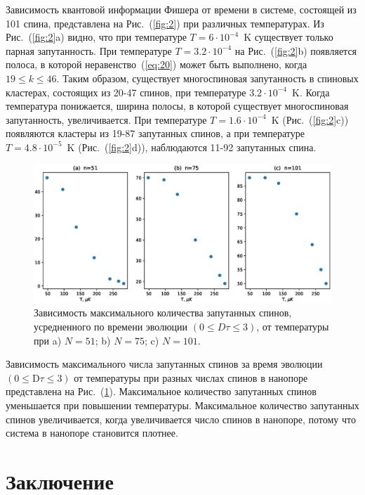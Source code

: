 \documentclass[utf8]{jetp}
\begin{document}
 Зависимость квантовой информации Фишера от времени в системе, состоящей из 101 спина, представлена на Рис.~(\ref{fig:2}) при различных температурах.
Из Рис.~(\ref{fig:2}a) видно, что при температуре $T=6\cdot10^{-4}$~K существует только парная запутанность.
При температуре $T=3.2\cdot10^{-4}$ на Рис.~(\ref{fig:2}b) появляется полоса, в которой неравенство~(\ref{eq:20}) может быть выполнено, когда $19 \leq k \leq 46$.
Таким образом, существует многоспиновая запутанность в спиновых кластерах, состоящих из 20-47 спинов, при температуре $3.2\cdot10^{-4}$~K.
Когда температура понижается, ширина полосы, в которой существует многоспиновая запутанность, увеличивается.
При температуре $T=1.6\cdot10^{-4}$~K (Рис.~(\ref{fig:2}c)) появляются кластеры из 19-87 запутанных спинов, а при температуре $T=4.8\cdot10^{-5}$~K (Рис.~(\ref{fig:2}d)), наблюдаются 11-92 запутанных спина.

\begin{figure}
 	\includegraphics[width=0.95\linewidth]{entangled_spins_by_n.eps}
	\caption{
	  Зависимость максимального количества запутанных спинов,
	  усредненного по времени эволюции $(0 \leq D\tau \leq 3)$,
	  от температуры при  a) $N=51$; b) $N=75$; c) $N=101$.
	}
	\label{fig:3}
\end{figure}

Зависимость максимального числа запутанных спинов за время эволюции $({0}\leq \mathrm{D}\tau\leq{3})$ от температуры при разных числах спинов в нанопоре представлена на Рис.~(\ref{fig:3}).
Максимальное количество запутанных спинов уменьшается при повышении температуры.
Максимальное количество запутанных спинов увеличивается, когда увеличивается число спинов в нанопоре, потому что система в нанопоре становится плотнее.



\section{Заключение}
\label{sec:6}
\end{document}
